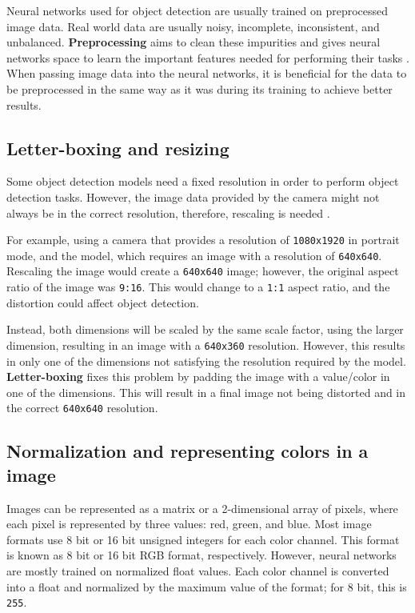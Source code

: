 \label{imagePreprocessing}
Neural networks used for object detection are usually trained on preprocessed image data. Real world data are usually noisy, incomplete, inconsistent, and unbalanced. \textbf{Preprocessing} aims to clean these impurities and gives neural networks space to learn the important features needed for performing their tasks \cite{glossaryImagePreprocessing}. When passing image data into the neural networks, it is beneficial for the data to be preprocessed in the same way as it was during its training to achieve better results. 

\subsection{Letter-boxing and resizing}
\label{letterboxing}
Some object detection models need a fixed resolution in order to perform object detection tasks. However, the image data provided by the camera might not always be in the correct resolution, therefore, rescaling is needed \cite{letterboxingAndNormalization}.

For example, using a camera that provides a resolution of \texttt{1080x1920} in portrait mode, and the model, which requires an image with a resolution of \texttt{640x640}. Rescaling the image would create a \texttt{640x640} image; however, the original aspect ratio of the image was \texttt{9:16}. This would change to a \texttt{1:1} aspect ratio, and the distortion could affect object detection.

Instead, both dimensions will be scaled by the same scale factor, using the larger dimension, resulting in an image with a \texttt{640x360} resolution. However, this results in only one of the dimensions not satisfying the resolution required by the model. \textbf{Letter-boxing} fixes this problem by padding the image with a value/color in one of the dimensions. This will result in a final image not being distorted and in the correct \texttt{640x640} resolution.


\subsection{Normalization and representing colors in a image}
Images can be represented as a matrix or a 2-dimensional array of pixels, where each pixel is represented by three values: red, green, and blue. Most image formats use 8 bit or 16 bit unsigned integers for each color channel. This format is known as 8 bit or 16 bit RGB format, respectively. However, neural networks are mostly trained on normalized float values. Each color channel is converted into a float and normalized by the maximum value of the format; for 8 bit, this is \texttt{255}.


